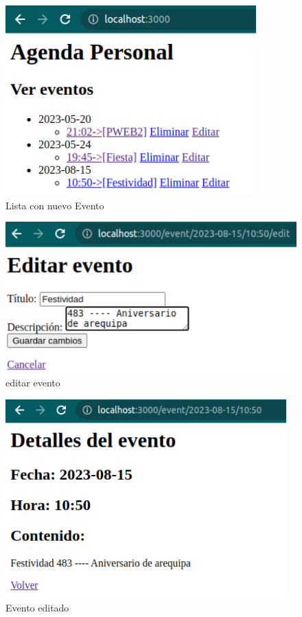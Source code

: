 \documentclass{article}
\begin{document}
\begin{figure}[H]
    \centering
    \includegraphics[scale=0.5]{img/exe/lista-con-nuevoElemento.png}
    \caption{Lista con nuevo Evento}
\end{figure}
\begin{figure}[H]
    \centering
    \includegraphics[scale=0.5]{img/exe/editar-evento.png}
    \caption{editar evento}
\end{figure}
\begin{figure}[H]
    \centering
    \includegraphics[scale=0.5]{img/exe/evento-editado.png}
    \caption{Evento editado}
\end{figure}
\end{document}
